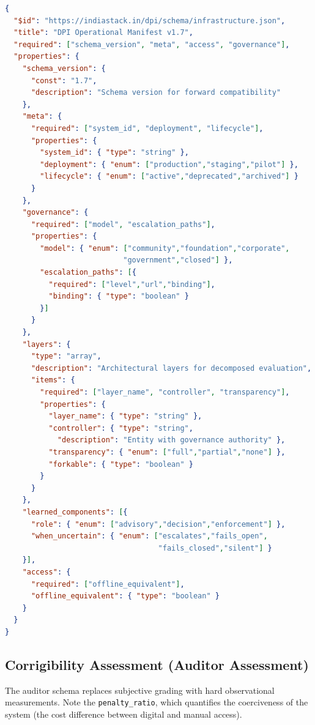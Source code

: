 \documentclass{article}
\begin{document}
\begin{lstlisting}[language=json,caption={Operator Disclosure Schema (condensed)}]
{
  "$id": "https://indiastack.in/dpi/schema/infrastructure.json",
  "title": "DPI Operational Manifest v1.7",
  "required": ["schema_version", "meta", "access", "governance"],
  "properties": {
    "schema_version": {
      "const": "1.7",
      "description": "Schema version for forward compatibility"
    },
    "meta": {
      "required": ["system_id", "deployment", "lifecycle"],
      "properties": {
        "system_id": { "type": "string" },
        "deployment": { "enum": ["production","staging","pilot"] },
        "lifecycle": { "enum": ["active","deprecated","archived"] }
      }
    },
    "governance": {
      "required": ["model", "escalation_paths"],
      "properties": {
        "model": { "enum": ["community","foundation","corporate",
                           "government","closed"] },
        "escalation_paths": [{
          "required": ["level","url","binding"],
          "binding": { "type": "boolean" }
        }]
      }
    },
    "layers": {
      "type": "array",
      "description": "Architectural layers for decomposed evaluation",
      "items": {
        "required": ["layer_name", "controller", "transparency"],
        "properties": {
          "layer_name": { "type": "string" },
          "controller": { "type": "string",
            "description": "Entity with governance authority" },
          "transparency": { "enum": ["full","partial","none"] },
          "forkable": { "type": "boolean" }
        }
      }
    },
    "learned_components": [{
      "role": { "enum": ["advisory","decision","enforcement"] },
      "when_uncertain": { "enum": ["escalates","fails_open",
                                   "fails_closed","silent"] }
    }],
    "access": {
      "required": ["offline_equivalent"],
      "offline_equivalent": { "type": "boolean" }
    }
  }
}
\end{lstlisting}

\subsection{Corrigibility Assessment (Auditor Assessment)}

The auditor schema replaces subjective grading with hard observational measurements. Note the \texttt{penalty\_ratio}, which quantifies the coerciveness of the system (the cost difference between digital and manual access).
\end{document}
